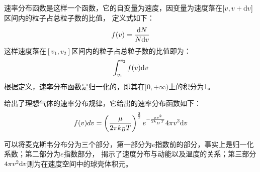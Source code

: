         \subsection[麦克斯韦分布]{}
            速率分布函数是这样一个函数，它的自变量为速度，因变量为速度落在$[v,v+\mathrm{d}{v}]$区间内的粒子占总粒子数的比值，
            定义式如下：
            \begin{equation}
                f(v) = \frac{\mathrm{d}{N}}{N\mathrm{d}{v}}
                \nonumber
            \end{equation}
            这样速度落在$[v_{1},v_{2}]$区间内的粒子占总粒子数的比值即为：
            \begin{equation}
                \int_{v_{1}}^{v_{2}} f(v)\mathrm{d}{v}
                \nonumber
            \end{equation}
            根据定义，速率分布函数是归一化的，即其在$[0,+\infty)$上的积分为1。
                
            给出了理想气体的速率分布规律，它给出的速率分布函数如下：
            \begin{equation}
                f(v)dv=\left(\frac \mu{2\pi k_{B}T}\right)^{\frac{3}{2}}e^{-\frac{\mu v^{2}}{2k_{_B}T}}4\pi v^2\mathrm{d}{v}
                \nonumber
            \end{equation}
            
            可以将麦克斯韦分布分为三个部分，第一部分为$e$指数前的部分，事实上是归一化系数；第二部分为$e$指数部分，
            揭示了速度分布与动能以及温度的关系；第三部分$4\pi v^{2}\mathrm{d}{v}$则为在速度空间中的球壳体积元。

